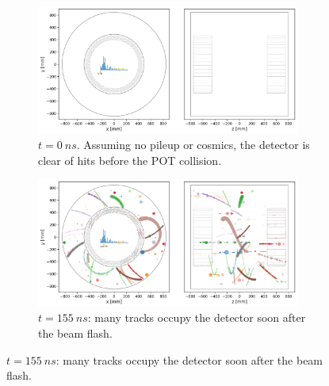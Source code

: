 \begin{figure}
    \centering
    
    \captionsetup[subfigure]{justification=centering}
    \begin{subfigure}[t]{0.49\textwidth}
    \centering
    \includegraphics[width=0.95\textwidth]{chapter3/frame_005.png}
    \caption{$t=\SI{0}{ns}$. Assuming no pileup or cosmics, the detector is clear of hits before the POT collision.}
    \end{subfigure}
    \hfill
    \begin{subfigure}[t]{0.49\textwidth}
    \centering
    \includegraphics[width=0.95\textwidth]{chapter3/frame_036.png}  
    \caption{$t=\SI{155}{ns}$: many tracks occupy the detector soon after the beam flash.}
    \end{subfigure}
    
    \vspace{0.3cm}
    

\end{figure}
